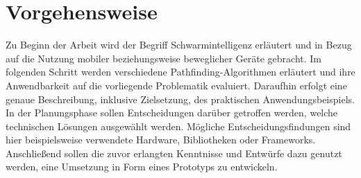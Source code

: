 \section{Vorgehensweise}
\label{sec:vorgehensweise}
Zu Beginn der Arbeit wird der Begriff Schwarmintelligenz erläutert und in Bezug auf die Nutzung mobiler beziehungsweise beweglicher Geräte gebracht. Im folgenden Schritt werden verschiedene Pathfinding-Algorithmen erläutert und ihre Anwendbarkeit auf die vorliegende Problematik evaluiert. Daraufhin erfolgt eine genaue Beschreibung, inklusive Zielsetzung, des praktischen Anwendungsbeispiels.   
In der Planungsphase sollen Entscheidungen darüber getroffen werden, welche technischen Lösungen ausgewählt werden. Mögliche Entscheidungsfindungen sind hier beispielsweise verwendete Hardware, Bibliotheken oder Frameworks. Anschließend sollen die zuvor erlangten Kenntnisse und Entwürfe dazu genutzt werden, eine Umsetzung in Form eines Prototyps zu entwickeln.

